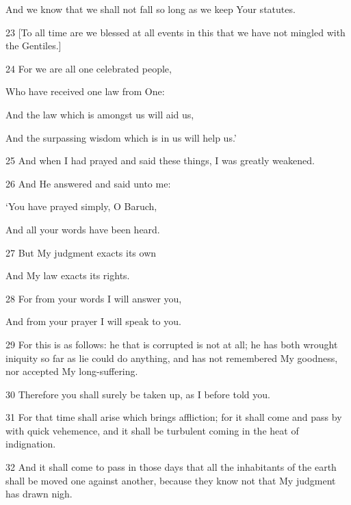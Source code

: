 \par And we know that we shall not fall so long as we keep Your statutes.

\par 23 [To all time are we blessed at all events in this that we have not mingled with the Gentiles.]

\par 24 For we are all one celebrated people,

\par Who have received one law from One:

\par And the law which is amongst us will aid us,

\par And the surpassing wisdom which is in us will help us.’

\par 25 And when I had prayed and said these things, I was greatly weakened. 

\par 26 And He answered and said unto me:

\par ‘You have prayed simply, O Baruch,

\par And all your words have been heard.

\par 27 But My judgment exacts its own

\par And My law exacts its rights.

\par 28 For from your words I will answer you,

\par And from your prayer I will speak to you.

\par 29 For this is as follows: he that is corrupted is not at all; he has both wrought iniquity so far as lie could do anything, and has not remembered My goodness, nor accepted My long-suffering. 

\par 30 Therefore you shall surely be taken up, as I before told you. 

\par 31 For that time shall arise which brings affliction; for it shall come and pass by with quick vehemence, and it shall be turbulent coming in the heat of indignation. 

\par 32 And it shall come to pass in those days that all the inhabitants of the earth shall be moved one against another, because they know not that My judgment has drawn nigh.


